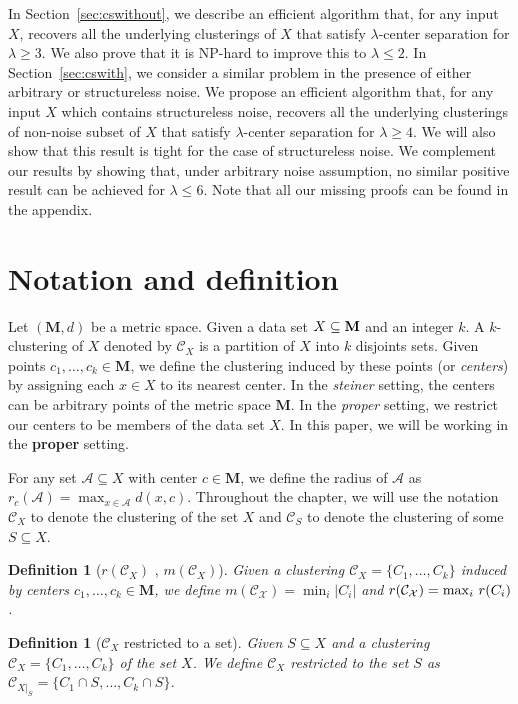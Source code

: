 \documentclass[12pt]{article}
\newtheorem{definition}[theorem]{Definition}
\newcommand{\mc}{\mathcal}
\newcommand{\mb}{\mathbf}
\begin{document}
In Section~\ref{sec:cswithout}, we describe an efficient algorithm that, for any input $X$, recovers all the underlying clusterings of $X$ that satisfy $\lambda$-center separation for $\lambda \geq 3$. We also prove that it is NP-hard to improve this to $\lambda \leq 2$. In Section~\ref{sec:cswith}, we consider a similar problem in the presence of either arbitrary or structureless noise. We propose an efficient algorithm that, for any input $X$ which contains structureless noise, recovers all the underlying clusterings of non-noise subset of $X$ that satisfy $\lambda$-center separation for $\lambda \geq 4$. We will also show that this result is tight for the case of structureless noise. We complement our results by showing that, under arbitrary noise assumption, no similar positive result can be achieved for $\lambda \leq 6$. Note that all our missing proofs can be found in the appendix.

\section{Notation and definition}
\label{sec:Notation}
Let $(\mb M, d)$ be a metric space. Given a data set $X \subseteq \bf M$ and an integer $k$. A $k$-clustering of $X$ denoted by $\mc C_{X}$ is a partition of $X$ into $k$ disjoints sets. Given points $c_1, \ldots, c_k \in \mb M$, we define the clustering induced by these points (or {\it centers}) by assigning each $x \in X$ to its nearest center. In the {\it steiner} setting, the centers can be arbitrary points of the metric space $\mb M$. In the {\it proper} setting, we restrict our centers to be members of the data set $X$. In this paper, we will be working in the {\bf proper} setting.

For any set $\mc A\subseteq X$ with center $c\in \mb M$, we define the radius of $\mc A$ as $r_c(\mc A) = \max_{x \in \mc A} d(x, c)$. Throughout the chapter, we will use the notation $\mc C_{X}$ to denote the clustering of the set $X$ and $\mc C_{S}$ to denote the clustering of some $S\subseteq X$. 

\begin{definition}[$r(\mc C_{X})$ , $m(\mc C_{X})$] Given a clustering $\mc C_{X} = \{C_1, \ldots, C_k\}$ induced by centers $c_1, \ldots, c_k \in \mb M$, we define $m(\mc{C}_{\mc{X}}) = \min_i |C_i|$ and $r(\mc{C}_{\mc{X}}) = \max_i \thinspace r(C_i)$.
\end{definition}

\begin{definition}[$\mc C_{X}$ restricted to a set] Given $S \subseteq X$ and a clustering $\mc C_{X} = \{C_1, \ldots, C_k\}$ of the set $X$. We define $\mc C_{X}$ restricted to the set $S$ as $\mc C_{{X}|_{S}} = \{C_1 \cap S, \ldots, C_k \cap S\}$. 
\end{definition}
\end{document}
